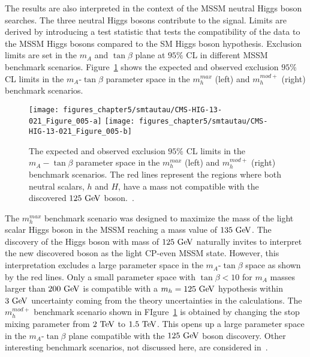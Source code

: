 The results are also interpreted in the context of the MSSM neutral Higgs boson searches. The three neutral Higgs bosons contribute to the signal.  Limits are derived by introducing a test statistic that tests the compatibility of the data to the MSSM  Higgs bosons compared to the SM Higgs boson hypothesis. Exclusion limits are set in the $m_{A}$ and $\tan \beta$ plane at $95\%$ CL in different MSSM benchmark scenarios. Figure~\ref{fig:mssmlimit} shows the expected and observed exclusion $95\%$ CL limits in the $m_{A}$-$\tan\beta$ parameter space in the $m_h^{max}$ (left) and $m_{h}^{mod+}$ (right) benchmark scenarios.
\begin{figure}[htbp]
\centering
\texttt{[image: figures\_chapter5/smtautau/CMS-HIG-13-021\_Figure\_005-a]}
\texttt{[image: figures\_chapter5/smtautau/CMS-HIG-13-021\_Figure\_005-b]}
\caption{The expected and observed exclusion $95\%$ CL limits in the $m_{A}-\tan\beta$ parameter space in the $m_h^{max}$ (left) and $m_{h}^{mod+}$ (right) benchmark scenarios. The red lines represent the regions where both neutral scalars, $h$ and $H$, have a mass not compatible with the discovered $125~\mathrm{Ge\kern -0.1em V}$ boson.~\cite{Khachatryan:2014wca}.}
\label{fig:mssmlimit}
\end{figure}
The $m_{h}^{max}$ benchmark scenario was designed to maximize the mass of the light scalar Higgs boson in the MSSM reaching a mass value of $135~\mathrm{Ge\kern -0.1em V}$. The discovery of the Higgs boson with mass of $125~\mathrm{Ge\kern -0.1em V}$ naturally invites to interpret the new discovered boson as the light CP-even MSSM state. However, this interpretation excludes a large parameter space in the $m_{A}$-$\tan\beta$ space as shown by the red lines. Only a small parameter space with $\tan\beta<10$ for $m_{A}$ masses larger than $200~\mathrm{Ge\kern -0.1em V}$ is compatible with a $m_{h}=125~\mathrm{Ge\kern -0.1em V}$ hypothesis within $3~\mathrm{Ge\kern -0.1em V}$ uncertainty coming from the theory uncertainties in the calculations. The $m_{h}^{mod+}$ benchmark scenario shown in FIgure~\ref{fig:mssmlimit} is obtained by changing the stop mixing parameter from $2~\mathrm{Te\kern -0.1em V}$ to $1.5~\mathrm{Te\kern -0.1em V}$.  This opens up a large parameter space in the $m_{A}$-$\tan\beta$ plane compatible with the $125~\mathrm{Ge\kern -0.1em V}$ boson discovery. Other interesting benchmark scenarios, not discussed here,  are considered in~\cite{Khachatryan:2014wca}.